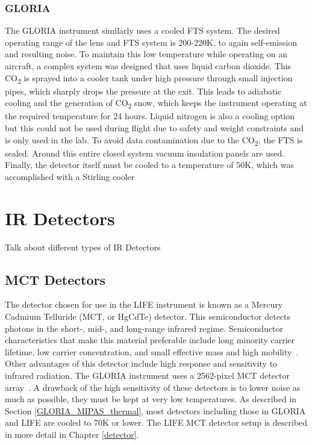 \subsubsection{GLORIA}
The GLORIA instrument similarly uses a cooled FTS system. The desired operating range of the lens and FTS system is 200-220K, to again self-emission and resulting noise. To maintain this low temperature while operating on an aircraft, a complex system was designed that uses liquid carbon dioxide. This CO\textsubscript{2} is sprayed into a cooler tank under high pressure through small injection pipes, which sharply drops the pressure at the exit. This leads to adiabatic cooling and the generation of CO\textsubscript{2} snow, which keeps the instrument operating at the required temperature for 24 hours. Liquid nitrogen is also a cooling option but this could not be used during flight due to safety and weight constraints and is only used in the lab. To avoid data contamination due to the CO\textsubscript{2}, the FTS is sealed. Around this entire closed system vacuum insulation panels are used. Finally, the detector itself must be cooled to a temperature of 50K, which was accomplished with a Stirling cooler~\cite{GLORIA_concept}~\cite{GLORIA_thermalmech}

\section{IR Detectors}
Talk about different types of IR Detectors

\subsection{MCT Detectors}
The detector chosen for use in the LIFE instrument is known as a Mercury Cadmium Telluride (MCT, or HgCdTe) detector. This semiconductor detects photons in the short-, mid-, and long-range infrared regime. Semiconductor characteristics that make this material preferable include long minority carrier lifetime, low carrier concentration, and small effective mass and high mobility~\cite{MCT_Detectors}. Other advantages of this detector include high response and sensitivity to infrared radiation. The GLORIA instrument uses a 2562-pixel MCT detector array~\cite{GLORIA_concept}. A drawback of the high sensitivity of these detectors is to lower noise as much as possible, they must be kept at very low temperatures. As described in Section \ref{GLORIA_MIPAS_thermal}, most detectors including those in GLORIA and LIFE are cooled to 70K or lower. The LIFE MCT detector setup is described in more detail in Chapter \ref{detector}.

